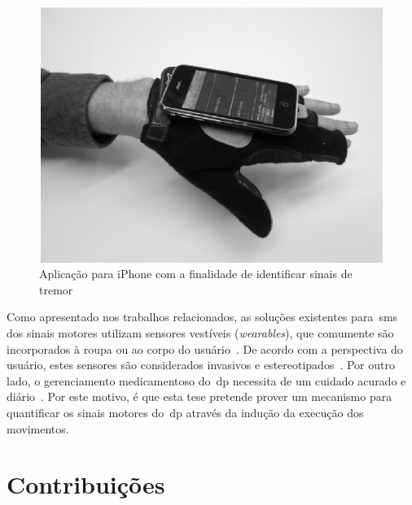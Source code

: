\begin{figure}
\centering
  \includegraphics[scale=0.3]{./img/moyne-iphone.png}
\caption[Aplicação para \textit{smartphone} com a finalidade de identificar sinais de tremor]{Aplicação para iPhone com a finalidade de identificar sinais de tremor ~\cite{lemoyne2010}}
 \label{fig:iphone-tremor}
\end{figure}

Como apresentado nos trabalhos relacionados, as soluções existentes para~\ac{sms} dos sinais motores utilizam sensores vestíveis (\textit{wearables}), que comumente são incorporados à roupa ou ao corpo do usuário~\cite{classifiersparkinson2014}. De acordo com a perspectiva do usuário, estes sensores são considerados invasivos e estereotipados~\cite{aarhus_negotiating_2010}. Por outro lado, o gerenciamento medicamentoso do~\ac{dp} necessita de um cuidado acurado e diário~\cite{parkself2015,quantitativeparkinson2011}. Por este motivo, é que esta tese pretende prover um mecanismo para quantificar os sinais motores do~\ac{dp} através da indução da execução dos movimentos.

\section{Contribuições}

